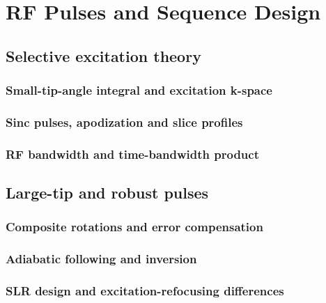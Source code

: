 \chapter{RF Pulses and Sequence Design}
\label{ch:18}

\section{Selective excitation theory}
\label{sec:18:selective-excitation-theory}
\subsection{Small-tip-angle integral and excitation k-space}
\subsection{Sinc pulses, apodization and slice profiles}
\subsection{RF bandwidth and time-bandwidth product}

\section{Large-tip and robust pulses}
\label{sec:18:large-tip-and-robust-pulses}
\subsection{Composite rotations and error compensation}
\subsection{Adiabatic following and inversion}
\subsection{SLR design and excitation-refocusing differences}

